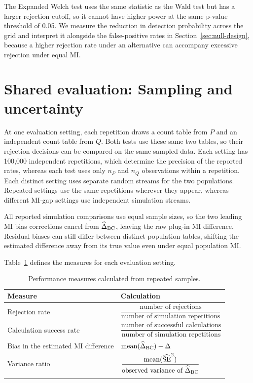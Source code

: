 The Expanded Welch test uses the same statistic as the Wald test but has a larger
rejection cutoff, so it cannot have higher power at the same p-value
threshold of 0.05.
We measure the reduction in detection probability across the grid and
interpret it alongside the false-positive rates in
Section~\ref{sec:null-design}, because a higher rejection rate under an
alternative can accompany excessive rejection under equal MI.

\section{Shared evaluation: Sampling and uncertainty}

At one evaluation setting, each repetition draws a count table from
\(P\) and an independent count table from \(Q\). Both tests use these
same two tables, so their rejection decisions
can be compared on the same sampled data. Each setting has 100,000
independent repetitions, which determine the precision of the reported
rates, whereas each test uses only \(n_P\) and \(n_Q\) observations within
a repetition. Each distinct setting uses separate random streams for the
two populations. Repeated settings use the same repetitions wherever they
appear, whereas different MI-gap settings use independent simulation streams.

All reported simulation comparisons use equal sample sizes, so the two
leading MI bias corrections cancel from \(\widehat\Delta_{\mathrm{BC}}\), leaving the raw
plug-in MI difference. Residual biases can still differ between distinct
population tables, shifting the estimated difference away from its true
value even under equal population MI.

Table~\ref{tab:design-performance-measures} defines the measures for each
evaluation setting.

\begin{table}[H]
\centering
\caption{Performance measures calculated from repeated samples.}
\label{tab:design-performance-measures}
\thesistableformat
\begin{tabularx}{\textwidth}{@{}>{\raggedright\arraybackslash}p{}>{\raggedright\arraybackslash}X@{}}
\toprule
\textbf{Measure} & \textbf{Calculation}\\
\midrule
\addlinespace[0.35em]
Rejection rate &
\(\dfrac{\text{number of rejections}}{\text{number of simulation repetitions}}\)\\
\addlinespace[0.85em]
Calculation success rate &
\(\dfrac{\text{number of successful calculations}}{\text{number of simulation repetitions}}\)\\
\addlinespace[0.85em]
Bias in the estimated MI difference &
\(\operatorname{mean}(\widehat\Delta_{\mathrm{BC}})-\Delta\)\\
\addlinespace[0.85em]
Variance ratio &
\(\dfrac{\operatorname{mean}(\widehat{\operatorname{SE}}^2)}{\text{observed variance of }\widehat\Delta_{\mathrm{BC}}}\)\\
\addlinespace[0.35em]
\bottomrule
\end{tabularx}
\end{table}

